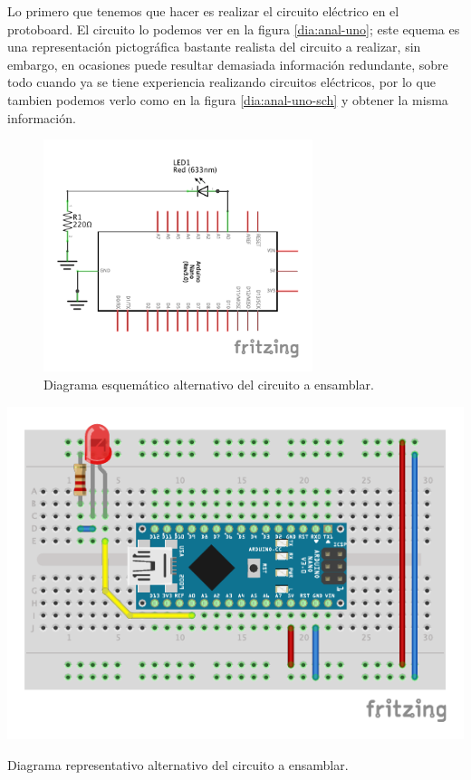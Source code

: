     Lo primero que tenemos que hacer es realizar el circuito eléctrico en el protoboard. El circuito lo podemos ver en la figura \ref{dia:anal-uno}; este equema es una representación pictográfica bastante realista del circuito a realizar, sin embargo, en ocasiones puede resultar demasiada información redundante, sobre todo cuando ya se tiene experiencia realizando circuitos eléctricos, por lo que tambien podemos verlo como en la figura \ref{dia:anal-uno-sch} y obtener la misma información.

		\begin{figure}[h]
    	\begin{center}
    		\includegraphics[width=0.7\textwidth]{images/1-LED-A0-nano_sch.pdf}
    		\caption{Diagrama esquemático alternativo del circuito a ensamblar.}
    		\label{dia:anal-nano-sch}
    	\end{center}
    \end{figure}

		\begin{marginfigure}
    	\begin{center}
    		\includegraphics[width=\textwidth]{images/1-LED-A0-nano_bb.pdf}
    		\caption{Diagrama representativo alternativo del circuito a ensamblar.}
    		\label{dia:anal-nano}
    	\end{center}
    \end{marginfigure}

